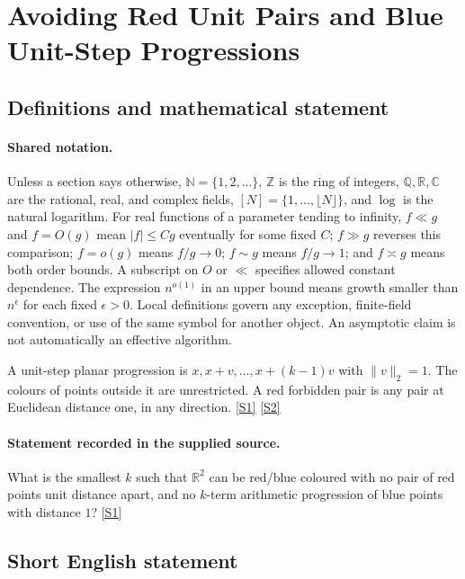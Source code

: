 \documentclass[11pt,a4paper]{article}
\newcommand{\N}{\mathbb{N}}
\newcommand{\Z}{\mathbb{Z}}
\newcommand{\Q}{\mathbb{Q}}
\newcommand{\R}{\mathbb{R}}
\newcommand{\C}{\mathbb{C}}
\newcommand{\sref}[2]{\hyperlink{source:#1:#2}{[S#2]}}
\begin{document}
\section{Avoiding Red Unit Pairs and Blue Unit-Step Progressions}\label{statement}


\subsection{Definitions and mathematical statement}

\paragraph{Shared notation.}Unless a section says otherwise, $\N=\{1,2,\ldots\}$,
$\Z$ is the ring of integers, $\Q,\R,\C$ are the rational, real, and complex
fields, $[N]=\{1,\ldots,\lfloor N\rfloor\}$, and $\log$ is the natural
logarithm. For real functions of a parameter tending to infinity,
$f\ll g$ and $f=O(g)$ mean $|f|\leq Cg$ eventually for some fixed $C$;
$f\gg g$ reverses this comparison; $f=o(g)$ means $f/g\to0$;
$f\sim g$ means $f/g\to1$; and $f\asymp g$ means both order bounds.
A subscript on $O$ or $\ll$ specifies allowed constant dependence.
The expression $n^{o(1)}$ in an upper bound means growth smaller than
$n^\epsilon$ for each fixed $\epsilon>0$. Local definitions govern any
exception, finite-field convention, or use of the same symbol for another
object. An asymptotic claim is not automatically an effective algorithm.



A unit-step planar progression is $x,x+v,\ldots,x+(k-1)v$ with $\|v\|_2=1$. The colours of points outside it are unrestricted. A red forbidden pair is any pair at Euclidean distance one, in any direction. \sref{statement}{1} \sref{statement}{2}

\paragraph{Statement recorded in the supplied source.}
What is the smallest $k$ such that $\mathbb{R}^2$ can be red/blue coloured with no pair of red points unit distance apart, and no $k$-term arithmetic progression of blue points with distance $1$? \sref{statement}{1}

\subsection{Short English statement}
\end{document}
